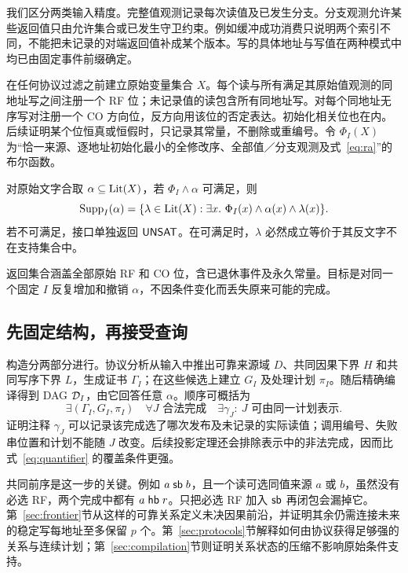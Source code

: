 我们区分两类输入精度。完整值观测记录每次读值及已发生分支。分支观测允许某些返回值只由允许集合或已发生守卫约束。例如缓冲成功消费只说明两个索引不同，不能把未记录的对端返回值补成某个版本。写的具体地址与写值在两种模式中均已由固定事件前缀确定。

在任何协议过滤之前建立原始变量集合 $X$。每个读与所有满足其原始值观测的同地址写之间注册一个 RF 位；未记录值的读包含所有同地址写。对每个同地址无序写对注册一个 CO 方向位，反方向用该位的否定表达。初始化相关位也在内。后续证明某个位恒真或恒假时，只记录其常量，不删除或重编号。令 $\Phi_I(X)$ 为“恰一来源、逐地址初始化最小的全修改序、全部值／分支观测及式~\eqref{eq:ra}”的布尔函数。

\begin{definition}[条件完整支持]\label{def:support}
对原始文字合取 $\alpha\subseteq\operatorname{Lit}(X)$，若 $\Phi_I\land\alpha$ 可满足，则
\[
 \Supp_I(\alpha)=\{\lambda\in\Lit(X):\exists x.\ \Phi_I(x)\land\alpha(x)\land\lambda(x)\}.
\]
若不可满足，接口单独返回 $\mathsf{UNSAT}$。在可满足时，$\lambda$ 必然成立等价于其反文字不在支持集合中。
\end{definition}

返回集合涵盖全部原始 RF 和 CO 位，含已退休事件及永久常量。目标是对同一个固定 $I$ 反复增加和撤销 $\alpha$，不因条件变化而丢失原来可能的完成。

\subsection{先固定结构，再接受查询}
构造分两部分进行。协议分析从输入中推出可靠来源域 $D$、共同因果下界 $H$ 和共同写序下界 $L$，生成证书 $\Gamma_I$；在这些候选上建立 $G_I$ 及处理计划 $\pi_I$。随后精确编译得到 DAG $\mathcal{D}_I$，由它回答任意 $\alpha$。顺序可概括为
\begin{equation}\label{eq:quantifier}
 \exists(\Gamma_I,G_I,\pi_I)\quad
 \forall J\text{ 合法完成}\quad
 \exists\gamma_J:\ J\text{ 可由同一计划表示}.
\end{equation}
证明注释 $\gamma_J$ 可以记录该完成选了哪次发布及未记录的实际读值；调用编号、失败串位置和计划不能随 $J$ 改变。后续投影定理还会排除表示中的非法完成，因而比式~\eqref{eq:quantifier} 的覆盖条件更强。

共同前序是这一步的关键。例如 $a\mathrel{\mathsf{sb}} b$，且一个读可选同值来源 $a$ 或 $b$，虽然没有必选 RF，两个完成中都有 $a\mathrel{\mathsf{hb}} r$。只把必选 RF 加入 $\mathsf{sb}$ 再闭包会漏掉它。第~\ref{sec:frontier}节从这样的可靠关系定义未决因果前沿，并证明其余仍需连接未来的稳定写每地址至多保留 $p$ 个。第~\ref{sec:protocols}节解释如何由协议获得足够强的关系与连续计划；第~\ref{sec:compilation}节则证明关系状态的压缩不影响原始条件支持。
